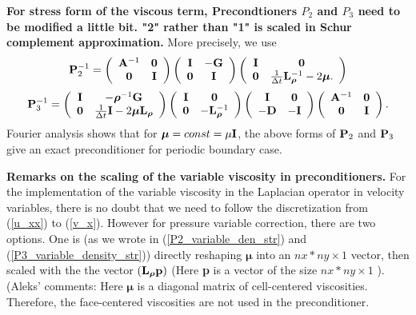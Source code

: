 \documentclass[9pt]{article}
\newcommand{\V}[1]{\boldsymbol{#1}}
\begin{document}
{\bf For stress form of the viscous term, Precondtioners $P_2$ and $P_3$ need to be modified a little bit. "2" rather than "1" is scaled in Schur complement approximation.} More precisely, we use
\begin{equation}\label{P2_variable_den_str}
{\bf P}_2^{-1}=\left(\begin{array}{cc}
{\bf A}^{-1} & {\bf 0} \\
{\bf 0}      & {\bf I}
\end{array}\right)
\left(\begin{array}{cc}
{\bf I}     & -{\bf G} \\
{\bf 0}     &  {\bf I}
\end{array}\right)
\left(\begin{array}{cc}
{\bf I}       & {\bf 0} \\
{\bf 0}       & \frac{1}{\Delta t} {\bf L}_{\V{\rho}}^{-1} - 2{\V{\mu}}.
\end{array}\right)
\end{equation}
\begin{equation}\label{P3_variable_density_str}
{\bf P}_3^{-1}=\left(\begin{array}{cc}
{\bf I} & - {\V{\rho}}^{-1}{\bf G} \\
{\bf 0}      & \frac{1}{\Delta t}{\bf I}- 2{\V{\mu}} {\bf L}_{\V{\rho}}
\end{array}\right)
\left(\begin{array}{cc}
{\bf I}     &  {\bf 0} \\
{\bf 0}     &  -{\bf L}_{\V{\rho}}^{-1}
\end{array}\right)
\left(\begin{array}{cc}
{\bf I}     &  {\bf 0} \\
-{\bf D}     &  -{\bf I}
\end{array}\right)
\left(\begin{array}{cc}
{\bf A}^{-1}       & {\bf 0} \\
{\bf 0}            & {\bf I}
\end{array}\right).
\end{equation}
Fourier analysis shows that for ${\V{\mu}}=const = \mu{\bf I}$, the above forms of ${\bf P}_2$ and ${\bf P}_3$ give an exact preconditioner for periodic boundary case.

{\bf Remarks on the scaling of the variable viscosity in preconditioners.} For the implementation of the variable viscosity in the Laplacian operator in velocity variables, there is no doubt that we need to follow the discretization from (\ref{u_xx}) to (\ref{v_x}). However for pressure variable correction, there are two options. One is (as we wrote in (\ref{P2_variable_den_str}) and (\ref{P3_variable_density_str})) directly reshaping ${\V{\mu}}$ into an $nx*ny \times 1$ vector, then scaled with the the vector $({\bf L}_{\V{\rho}}{\bf p})$ (Here {\bf p} is a vector of the size $nx*ny \times 1$ ). (Aleks' comments: Here ${\V{\mu}}$ is a diagonal matrix of cell-centered viscosities. Therefore, 
the face-centered viscosities are not used in the preconditioner. 
\end{document}
